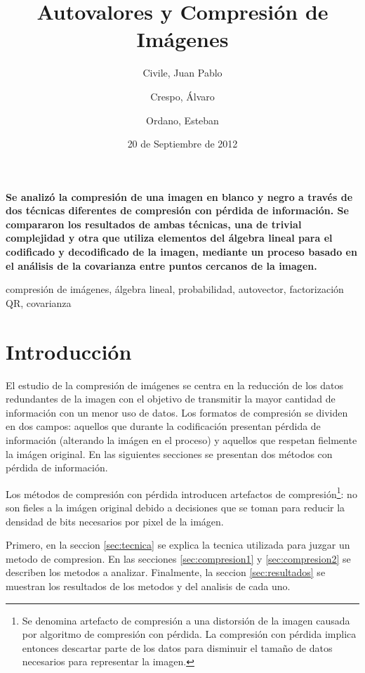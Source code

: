 \documentclass[twocolumn,a4paper,10pt]{article}
\title{Autovalores y Compresión de Imágenes}
\date{20 de Septiembre de 2012}
\author{Civile, Juan Pablo \and Crespo, Álvaro \and Ordano, Esteban }
\begin{document}
\pagestyle{fancy}
\maketitle
\thispagestyle{fancy}

\begin{customabstract}
\textbf{
    Se analizó la compresión de una imagen en blanco y negro a través de dos técnicas diferentes de compresión con pérdida de información.
    Se compararon los resultados de ambas técnicas, una de trivial complejidad y otra que utiliza elementos del álgebra lineal para el codificado
    y decodificado de la imagen, mediante un proceso basado en el análisis de la covarianza entre puntos cercanos de la imagen.
}
\end{customabstract}

\begin{keywords}
compresi\'on de im\'agenes, \'algebra lineal, probabilidad, autovector, factorizaci\'on QR, covarianza
\end{keywords}


\section{Introducci\'on}

El estudio de la compresi\'on de im\'agenes se centra en la reducci\'on de los datos redundantes de la imagen con el objetivo de transmitir la mayor cantidad de información con un menor uso de datos. Los formatos de compresi\'on se dividen en dos campos: aquellos que durante la codificación presentan p\'erdida de información (alterando la imágen en el proceso) y aquellos que respetan fielmente la imágen original. 
En las siguientes secciones se presentan dos métodos con pérdida de información. 

Los métodos de compresión con p\'erdida introducen artefactos de compresión\footnote{Se denomina artefacto de compresi\'on a una distorsión de la imagen causada por algoritmo de compresi\'on con p\'erdida. La compresi\'on con p\'erdida implica entonces descartar parte de los datos para disminuir el tamaño de datos necesarios para representar la imagen.}: no son fieles a la imágen original debido a decisiones que se toman para reducir la densidad de bits necesarios por pixel de la imágen.

Primero, en la seccion \ref{sec:tecnica} se explica la tecnica utilizada para juzgar un metodo de compresion.
En las secciones \ref{sec:compresion1} y \ref{sec:compresion2} se describen los metodos a analizar. 
Finalmente, la seccion \ref{sec:resultados} se muestran los resultados de los metodos y del analisis de cada uno.
\end{document}
